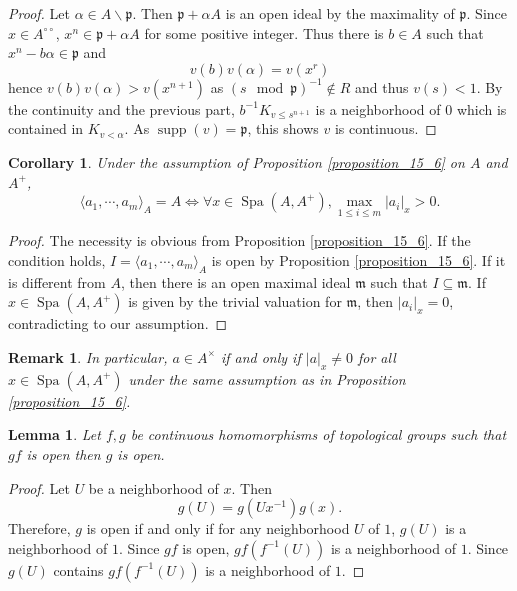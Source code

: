 \documentclass[8pt]{article}
\numberwithin{equation}{section}
\newtheorem{lemma}{Lemma}[subsection]
\newtheorem{remark}{Remark}[subsection]
\newtheorem{corollary}{Corollary} [subsection]
\DeclareMathOperator{\supp}{supp}
\DeclareMathOperator{\Spa}{Spa}
\newcommand{\m}[0]{\mathfrak{m}}
\newcommand{\p}[0]{\mathfrak{p}}
\newcommand{\dcirc}[0]{{\circ\circ}}
\begin{document}
\begin{proof}
Let $\alpha\in A\backslash\p$. Then $\p+\alpha A$ is an open ideal by the maximality of $\p$. Since $x\in A^\dcirc$, $x^n\in\p+\alpha A$ for some positive integer. Thus there is $b\in A$ such that $x^n-b\alpha\in\p$ and
\begin{equation*}
    v(b)v(\alpha) = v(x^r)
\end{equation*}
hence $v(b)v(\alpha)>v(x^{n+1})$ as $(s\mod{\p})^{-1}\not\in R$ and thus $v(s)<1$.%
By the continuity and the previous part, $b^{-1}K_{v\leq s^{n+1}}$ is a neighborhood of $0$ which is contained in $K_{v<\alpha}$. As $\supp(v)=\p$, this shows $v$ is continuous.
\end{proof}

\begin{corollary}
    \label{corollary_16_3}
    Under the assumption of Proposition \ref{proposition_15_6} on $A$ and $A^+$, 
    \begin{equation*}
        \langle a_1,\cdots,a_m\rangle_A = A\iff \forall x\in \Spa(A,A^+), \max_{1\leq i\leq m}\vert a_i\vert_x >0.
     \end{equation*}%
\end{corollary}
\begin{proof}
    The necessity is obvious from Proposition \ref{proposition_15_6}. If the condition holds, $I=\langle a_1,\cdots,a_m\rangle_A$ is open by Proposition \ref{proposition_15_6}. If it is different from $A$, then there is an open maximal ideal $\m$ such that $I\subseteq \m$. If $x\in\Spa(A,A^+)$ is given by the trivial valuation for $\m$, then $\vert a_i\vert_x=0$, contradicting to our assumption.
\end{proof}
\begin{remark}
    In particular, $a\in A^\times$ if and only if $\vert a\vert_x\not=0$ for all $x\in\Spa(A,A^+)$ under the same assumption as in Proposition \ref{proposition_15_6}.
\end{remark}

\begin{lemma}
    Let $f,g$ be continuous homomorphisms of topological groups such that $gf$ is open then $g$ is open.
    \label{lemma_16_17_1}
\end{lemma}
\begin{proof}
    Let $U$ be a neighborhood of $x$. Then 
    \begin{equation*}
    g(U) = g(Ux^{-1})g(x).
    \end{equation*}
    Therefore,  $g$ is open if and only if for any neighborhood $U$ of $1$, $g(U)$ is a neighborhood of $1$. %
    Since $gf$ is open, $gf(f^{-1}(U))$ is a neighborhood of $1$. Since $g(U)$ contains $gf(f^{-1}(U))$ is a neighborhood of $1$.
\end{proof}
\end{document}
